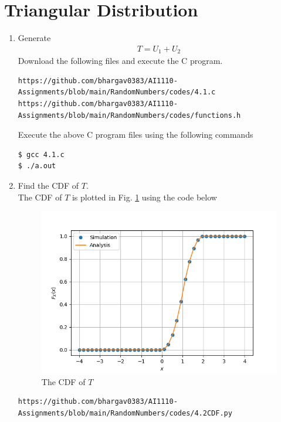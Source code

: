 \documentclass[journal,12pt,twocolumn]{IEEEtran}
\renewcommand\thesection{\arabic{section}}
\begin{document}
\section{Triangular Distribution}
\begin{enumerate}[label=\thesection.\arabic*
,ref=\thesection.\theenumi]
\item Generate
    \begin{align}
        T=U_1+U_2
    \end{align}
    \solution Download the following files and execute the  C program.
\begin{lstlisting}
https://github.com/bhargav0383/AI1110-Assignments/blob/main/RandomNumbers/codes/4.1.c
https://github.com/bhargav0383/AI1110-Assignments/blob/main/RandomNumbers/codes/functions.h
\end{lstlisting}
Execute the above C program files using the following commands
\begin{lstlisting}
$ gcc 4.1.c
$ ./a.out
\end{lstlisting}

\item Find the CDF of $T$.\\
\solution The CDF of $T$ is plotted in Fig. \ref{fig:4.2} using the code below
\begin{figure}[!h]
\centering
\includegraphics[width=\columnwidth]{./figs/4.2CDF.png}
\caption{The CDF of $T$}
\label{fig:4.2}
\end{figure}
\begin{lstlisting}
https://github.com/bhargav0383/AI1110-Assignments/blob/main/RandomNumbers/codes/4.2CDF.py
\end{lstlisting}


\end{enumerate}
\end{document}

